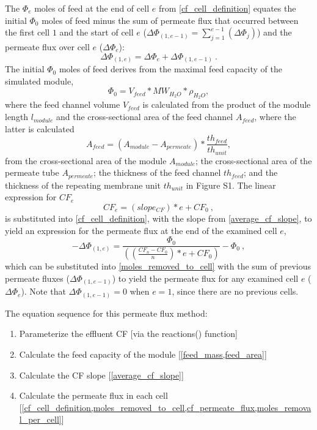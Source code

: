 \documentclass[journal=ACSES&TWater,manuscript=article]{achemso}
\begin{document}
The $\Phi_e$ moles of feed at the end of cell $e$ from \cref{cf_cell_definition} equates the initial $\Phi_0$ moles of feed minus the sum of permeate flux that occurred between the first cell $1$ and the start of cell $e$ ($\Delta \Phi_{(1,e-1)}=\sum_{j=1}^{e-1}(\Delta \Phi_{j})$) and the permeate flux over cell $e$ ($\Delta \Phi_{e}$):
\begin{equation} \label{moles_removed_to_cell}
    \Delta \Phi_{(1,e)}=\Delta \Phi_{e}+\Delta \Phi_{(1,e-1)}~.
\end{equation}
The initial $\Phi_0$ moles of feed derives from the maximal feed capacity of the simulated module,
\begin{equation} \label{feed_mass}
    \Phi_0=V_{feed}*MW_{H_2O}*\rho_{H_2O},
\end{equation}
where the feed channel volume $V_{feed}$ is calculated from the product of the module length $l_{module}$ and the cross-sectional area of the feed channel $A_{feed}$, where the latter is calculated
\begin{equation} \label{feed_area}
    A_{feed}=(A_{module}-A_{permeate})*\frac{th_{feed}}{th_{unit}},
\end{equation}
from the cross-sectional area of the module $A_{module}$; the cross-sectional area of the permeate tube $A_{permeate}$; the thickness of the feed channel $th_{feed}$; and the thickness of the repeating membrane unit $th_{unit}$ in Figure S1.
The linear expression for $CF_e$ 
\begin{equation} \label{cf_permeate_flux}
    CF_e=(slope_{CF})*e+CF_{0}~,
\end{equation}
is substituted into \cref{cf_cell_definition}, with the slope from \cref{average_cf_slope}, to yield an expression for the permeate flux at the end of the examined cell $e$,
\begin{equation} \label{moles_removal_per_cell} 
    -\Delta \Phi_{(1,e)}=\frac{\Phi_0}{((\frac{CF_{n}-CF_{0}}{n})*e+CF_{0})}-\Phi_0~,
\end{equation}
which can be substituted into \cref{moles_removed_to_cell} with the sum of previous permeate fluxes ($\Delta \Phi_{(1,e-1)}$) to yield the permeate flux for any examined cell $e$ ($\Delta \Phi_{e}$). Note that $\Delta \Phi_{(1,e-1)}=0$ when $e=1$, since there are no previous cells. 

The equation sequence for this permeate flux method:
\begin{enumerate}
    \item Parameterize the effluent CF [via the reactions() function]
    \item Calculate the feed capacity of the module [\cref{feed_mass,feed_area}]
    \item Calculate the CF slope [\cref{average_cf_slope}]
    \item Calculate the permeate flux in each cell [\cref{cf_cell_definition,moles_removed_to_cell,cf_permeate_flux,moles_removal_per_cell}]
\end{enumerate}
\end{document}
